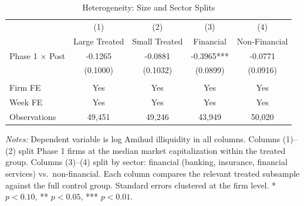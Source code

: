 \begin{table}[H]
\centering
\caption{Heterogeneity: Size and Sector Splits}
\label{tab:hetero}
\begin{threeparttable}
\begin{tabular}{lcccc}
\toprule
 & (1) & (2) & (3) & (4) \\
 & Large Treated & Small Treated & Financial & Non-Financial \\
\midrule
Phase 1 $\times$ Post & -0.1265 & -0.0881 & -0.3965*** & -0.0771 \\
 & (0.1000) & (0.1032) & (0.0899) & (0.0916) \\
 \\
\midrule
Firm FE & Yes & Yes & Yes & Yes \\
Week FE & Yes & Yes & Yes & Yes \\
Observations & 49,451 & 49,246 & 43,949 & 50,020 \\
\bottomrule
\end{tabular}
\begin{tablenotes}[flushleft]
\small
\item \textit{Notes:} Dependent variable is log Amihud illiquidity in all columns. Columns (1)--(2) split Phase 1 firms at the median market capitalization within the treated group. Columns (3)--(4) split by sector: financial (banking, insurance, financial services) vs.\ non-financial. Each column compares the relevant treated subsample against the full control group. Standard errors clustered at the firm level. * $p<0.10$, ** $p<0.05$, *** $p<0.01$.
\end{tablenotes}
\end{threeparttable}
\end{table}

